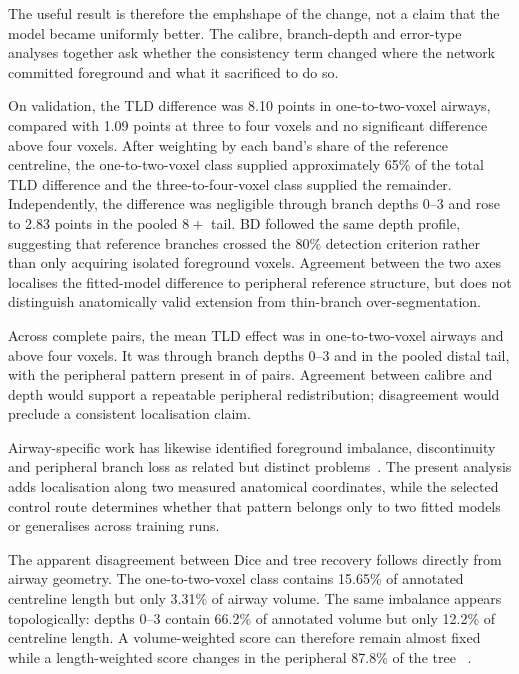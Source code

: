The useful result is therefore the emph{shape} of the change, not a claim that the model became
uniformly better. The calibre, branch-depth and error-type analyses together ask whether the
consistency term changed where the network committed foreground and what it sacrificed to do so.

\ifshowcurrentcontrol
\begin{currentcontrolroute}
On validation, the TLD difference was 8.10 points in one-to-two-voxel airways, compared with
1.09 points at three to four voxels and no significant difference above four voxels. After
weighting by each band's share of the reference centreline, the one-to-two-voxel class supplied
approximately 65\% of the total TLD difference and the three-to-four-voxel class supplied the
remainder. Independently, the difference was negligible through branch depths 0--3 and rose to
2.83 points in the pooled $8+$ tail. BD followed the same depth profile, suggesting that reference
branches crossed the 80\% detection criterion rather than only acquiring isolated foreground
voxels. Agreement between the two axes localises the fitted-model difference to peripheral
reference structure, but does not distinguish anatomically valid extension from thin-branch
over-segmentation.
\end{currentcontrolroute}
\fi

\ifshowpairedcontrol
\begin{pairedcontrolroute}
Across complete pairs, the mean TLD effect was \pending in one-to-two-voxel airways and \pending
above four voxels. It was \pending through branch depths 0--3 and \pending in the pooled distal
tail, with the peripheral pattern present in \pending[: number] of \pending[: number] pairs.
Agreement between calibre and depth would support a repeatable peripheral redistribution;
disagreement would preclude a consistent localisation claim.
\end{pairedcontrolroute}
\fi

Airway-specific work has likewise identified foreground imbalance, discontinuity and peripheral
branch loss as related but distinct problems~\cite{qin2019airwaynet,zheng2021gradient,
yu2022break,Nan2024FANN}. The present analysis adds localisation along two measured anatomical
coordinates, while the selected control route determines whether that pattern belongs only to
two fitted models or generalises across training runs.

The apparent disagreement between Dice and tree recovery follows directly from airway geometry.
The one-to-two-voxel class contains 15.65\% of annotated centreline length but only 3.31\% of
airway volume. The same imbalance appears topologically: depths 0--3 contain 66.2\% of annotated
volume but only 12.2\% of centreline length. A volume-weighted score can therefore remain almost
fixed while a length-weighted score changes in the peripheral 87.8\% of the tree
~\cite{dice1945association,zheng2021gradient,shit2021cldice,zhang2023atm22}.

